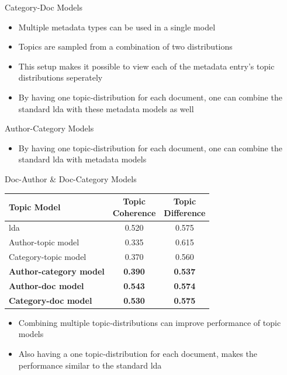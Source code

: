 \begin{frame}{\insertsubsection}{Category-Doc Models}
	\begin{figure}
		\centering
		\resizebox{0.3\columnwidth}{!}{%
			
		}
	\end{figure}
	\begin{itemize}
		\item<1-> Multiple metadata types can be used in a single model
		\item<2-> Topics are sampled from a combination of two distributions
		\item<3-> This setup makes it possible to view each of the metadata entry's topic distributions seperately
		\item<4-> By having one topic-distribution for each document, one can combine the standard \gls{lda} with these metadata models as well
	\end{itemize}
\end{frame}

\begin{frame}{\insertsubsection}{Author-Category Models}
	\begin{figure}
		\centering
		\resizebox{0.35\columnwidth}{!}{%
			
		}
	\end{figure}
	\begin{itemize}
		\item<1-> By having one topic-distribution for each document, one can combine the standard \gls{lda} with metadata models
	\end{itemize}
\end{frame}

\begin{frame}{\insertsubsection}{Doc-Author \& Doc-Category Models}
	\begin{table}
		\centering
		\begin{tabular}{l|c|c}
			Topic Model & \makecell{Topic \\ Coherence} & \makecell{Topic \\ Difference} \\
			\midrule
			\Acrlong{lda} & 0.520 & 0.575 \\
			Author-topic model & 0.335 & 0.615 \\
			Category-topic model & 0.370 & 0.560 \\
			\textbf{Author-category model} & \textbf{0.390} & \textbf{0.537} \\
			\textbf{Author-doc model} & \textbf{0.543} & \textbf{0.574} \\
			\textbf{Category-doc model} &\textbf{ 0.530} & \textbf{0.575} \\
		\end{tabular}
	\end{table}
	\begin{itemize}
		\item<2-> Combining multiple topic-distributions can improve performance of topic models
		\item<3-> Also having a one topic-distribution for each document, makes the performance similar to the standard \gls{lda}
	\end{itemize}
\end{frame}


